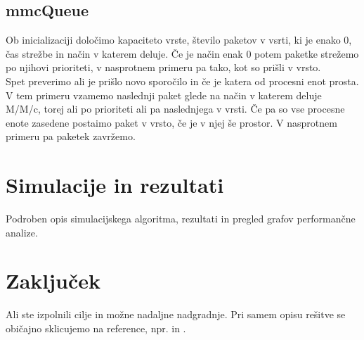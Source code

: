 \documentclass[a4paper,11pt]{article}
\begin{document}
\subsection{mmcQueue}

Ob inicializaciji določimo kapaciteto vrste, število paketov v vsrti, ki je enako 0, čas strežbe in način v katerem deluje. Če je način enak 0 potem paketke strežemo po njihovi prioriteti, v nasprotnem primeru pa tako, kot so prišli v vrsto.\\
Spet preverimo ali je prišlo novo sporočilo in če je katera od procesni enot prosta. V tem primeru vzamemo naslednji paket glede na način v katerem deluje M/M/c, torej ali po prioriteti ali pa naslednjega v vrsti. Če pa so vse procesne enote zasedene postaimo paket v vrsto, če je v njej še prostor. V nasprotnem primeru pa paketek zavržemo.

\section{Simulacije in rezultati}
Podroben opis simulacijskega algoritma, rezultati in pregled grafov performančne analize.

\section{Zaključek}
Ali ste izpolnili cilje in možne nadaljne nadgradnje. Pri samem opisu rešitve se običajno sklicujemo na reference, npr. \cite{omnetpp} in \cite{cisco}. 

\pagebreak


\end{document}
